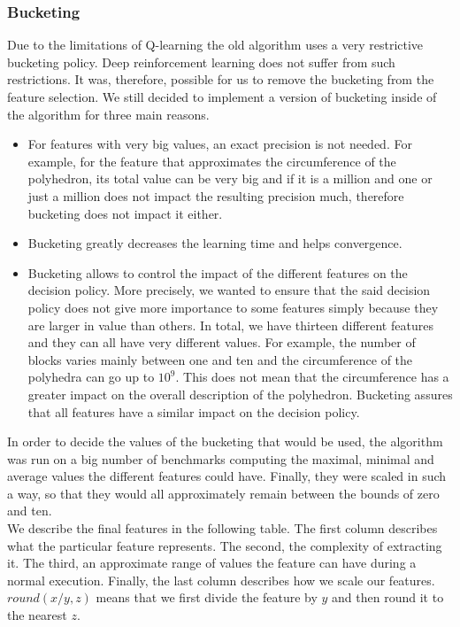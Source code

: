 \subsubsection{Bucketing}
Due to the limitations of Q-learning the old algorithm uses a very restrictive bucketing policy. Deep reinforcement learning does not suffer from such restrictions. It was, therefore, possible for us to remove the bucketing from the feature selection. We still decided to implement a version of bucketing inside of the algorithm for three main reasons. \\
\begin{itemize}
	\item For features with very big values, an exact precision is not needed. For example, for the feature that approximates the circumference of the polyhedron, its total value can be very big and if it is a million and one or just a million does not impact the resulting precision much, therefore bucketing does not impact it either.
	\item Bucketing greatly decreases the learning time and helps convergence.
	\item Bucketing allows to control the impact of the different features on the decision policy. More precisely, we wanted to ensure that the said decision policy does not give more importance to some features simply because they are larger in value than others. In total, we have thirteen different features and they can all have very different values. For example, the number of blocks varies mainly between one and ten and the circumference of the polyhedra can go up to $10^9$. This does not mean that the circumference has a greater impact on the overall description of the polyhedron. Bucketing assures that all features have a similar impact on the decision policy.
\end{itemize}
In order to decide the values of the bucketing that would be used,  the algorithm was run on a big number of benchmarks computing the maximal, minimal and average values the different features could have. Finally, they were scaled in such a way, so that they would all approximately remain between the bounds of zero and ten.\\
We describe the final features in the following table. The first column describes what the particular feature represents. The second, the complexity of extracting it. The third, an approximate range of values the feature can have during a normal execution. Finally, the last column describes how we scale our features. $round(x/y,z)$ means that we first divide the feature by $y$ and then round it to the nearest $z$.
